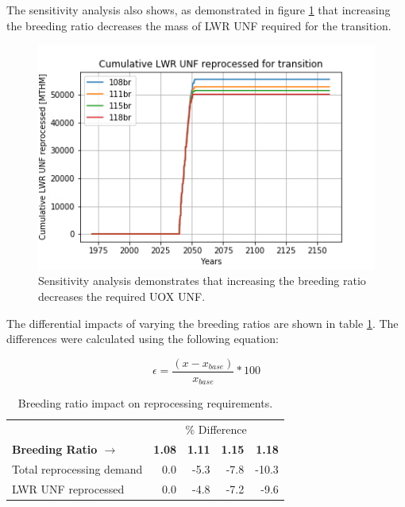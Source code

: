 The sensitivity analysis also shows, as demonstrated in figure \ref{fig:br_uox} that 
increasing the breeding ratio decreases the mass of \gls{LWR} \gls{UNF} 
required for the transition.

\begin{figure}[htbp!]
    \begin{center}
        \includegraphics[scale=0.6]{./images/sensitivity/br_uox_unf_cum.png}
    \end{center}
    \caption{Sensitivity analysis demonstrates that increasing the breeding 
    ratio decreases the required \gls{UOX} \gls{UNF}. }
    \label{fig:br_uox}
\end{figure}

The differential impacts of varying the breeding ratios are
shown in table \ref{tab:br_diff}. The differences were calculated
using the following equation:

\[ \epsilon = \frac{(x - x_{base})}{x_{base}} * 100 \]

\begin{table}[h]
	\centering
        \caption{Breeding ratio impact on reprocessing requirements.}
	\begin{tabular}{lrrrr}
		\hline
                & \multicolumn{4}{c}{\% Difference} \\
		\textbf{Breeding Ratio $\longrightarrow$}& \textbf{1.08}& \textbf{1.11} & \textbf{1.15} & \textbf{1.18} \\
		\hline
		Total reprocessing demand & 0.0 & -5.3 & -7.8 & -10.3 \\ 
		\gls{LWR} \gls{UNF} reprocessed & 0.0  & -4.8 & -7.2 & -9.6 \\
		\hline
	\end{tabular}
	\label{tab:br_diff}
\end{table}


